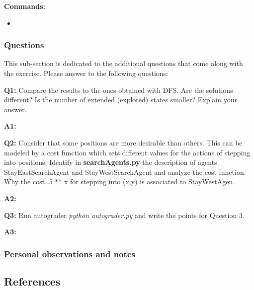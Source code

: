 

\textbf{Commands:}
\begin{itemize}
    \setlength\itemsep{0em}
    \item  %
        
\end{itemize}

\subsubsection{Questions}
This sub-section is dedicated to the additional questions that come along with the exercise. Please answer to the following questions:\newline 

\textbf{Q1:} Compare the results to the ones obtained with DFS. Are the solutions different? Is the number of extended (explored) states smaller? Explain your answer. 

\textbf{A1:} \newline %


\textbf{Q2:} Consider that some positions are more desirable than others. This can be modeled by a cost function which sets different values for the actions of stepping into positions. Identify in \textbf{searchAgents.py} the description of agents StayEastSearchAgent and StayWestSearchAgent and analyze the cost function. Why the cost .5 ** x for stepping into (x,y) is associated to StayWestAgen. 

\textbf{A2:} \newline %


\textbf{Q3:} Run autograder \textit{python autograder.py} and write the points for Question 3.

\textbf{A3:} \newline %

\subsubsection{Personal observations and notes}
\vspace{0.75cm}

\subsection{References}
